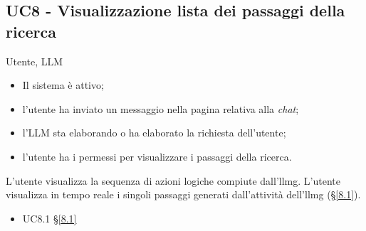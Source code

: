 \subsection{UC8 - Visualizzazione lista dei passaggi della ricerca}
\label{8}
\makeUC{}
{Utente, LLM}
{   \begin{itemize}
        \item Il sistema è attivo;
        \item l'utente ha inviato un messaggio nella pagina relativa alla \textit{chat};
        \item l'LLM sta elaborando o ha elaborato la richiesta dell'utente;
        \item l'utente ha i permessi per visualizzare i passaggi della ricerca.
    \end{itemize}
}
{L'utente visualizza la sequenza di azioni logiche compiute dall'\gls{llmg}.}
{L'utente visualizza in tempo reale i singoli passaggi generati dall'attività dell'\gls{llmg} (§\ref{8.1}).}
{
    \begin{itemize}
        \item UC8.1 §\ref{8.1}
    \end{itemize}
}
{}{}{}

